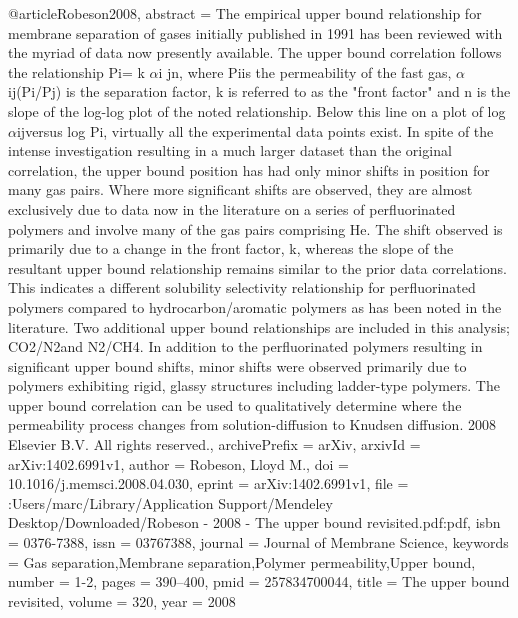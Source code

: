 @article{Robeson2008,
abstract = {The empirical upper bound relationship for membrane separation of gases initially published in 1991 has been reviewed with the myriad of data now presently available. The upper bound correlation follows the relationship Pi= k $\alpha$i jn, where Piis the permeability of the fast gas, $\alpha$ij(Pi/Pj) is the separation factor, k is referred to as the "front factor" and n is the slope of the log-log plot of the noted relationship. Below this line on a plot of log $\alpha$ijversus log Pi, virtually all the experimental data points exist. In spite of the intense investigation resulting in a much larger dataset than the original correlation, the upper bound position has had only minor shifts in position for many gas pairs. Where more significant shifts are observed, they are almost exclusively due to data now in the literature on a series of perfluorinated polymers and involve many of the gas pairs comprising He. The shift observed is primarily due to a change in the front factor, k, whereas the slope of the resultant upper bound relationship remains similar to the prior data correlations. This indicates a different solubility selectivity relationship for perfluorinated polymers compared to hydrocarbon/aromatic polymers as has been noted in the literature. Two additional upper bound relationships are included in this analysis; CO2/N2and N2/CH4. In addition to the perfluorinated polymers resulting in significant upper bound shifts, minor shifts were observed primarily due to polymers exhibiting rigid, glassy structures including ladder-type polymers. The upper bound correlation can be used to qualitatively determine where the permeability process changes from solution-diffusion to Knudsen diffusion. {\textcopyright} 2008 Elsevier B.V. All rights reserved.},
archivePrefix = {arXiv},
arxivId = {arXiv:1402.6991v1},
author = {Robeson, Lloyd M.},
doi = {10.1016/j.memsci.2008.04.030},
eprint = {arXiv:1402.6991v1},
file = {:Users/marc/Library/Application Support/Mendeley Desktop/Downloaded/Robeson - 2008 - The upper bound revisited.pdf:pdf},
isbn = {0376-7388},
issn = {03767388},
journal = {Journal of Membrane Science},
keywords = {Gas separation,Membrane separation,Polymer permeability,Upper bound},
number = {1-2},
pages = {390--400},
pmid = {257834700044},
title = {{The upper bound revisited}},
volume = {320},
year = {2008}
}
